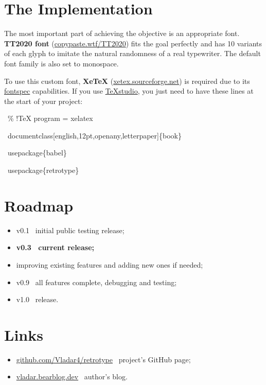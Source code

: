 \documentclass[english,12pt,openany,letterpaper]{book}
\begin{document}
\section{The Implementation}

The most important part of achieving the objective is an appropriate font. \textbf{TT2020 font} (\href{https://copypaste.wtf/TT2020/}{copypaste.wtf/TT2020}) fits the goal perfectly and has 10 variants of each glyph to imitate the natural randomness of a real typewriter. The default font family is also set to monospace.

\tab To use this custom font, \textbf{XeTeX} (\href{https://xetex.sourceforge.net/}{xetex.sourceforge.net}) is required due to its \href{https://ctan.org/pkg/fontspec}{fontspec} capabilities. If you use \href{https://www.texstudio.org/}{TeXstudio}, you just need to have these lines at the start of your project:

\begin{tabbox}[8][8]
\begin{textbox}
~\% !TeX program = xelatex

~\bs documentclass[english,12pt,openany,letterpaper]\{book\}

~\bs usepackage\{babel\}

~\bs usepackage\{retrotype\}
\end{textbox}
\end{tabbox}

\section{Roadmap}

\begin{itemize}
	\item v0.1 \dash\ initial public testing release;
	\item \textbf{v0.3 \dash\ current release;}
	\item improving existing features and adding new ones if needed;
	\item v0.9 \dash\ all features complete, debugging and testing;
	\item v1.0 \dash\ release.
\end{itemize}


\section{Links}

\begin{itemize}
	\item \href{https://github.com/Vladar4/retrotype}{github.com/Vladar4/retrotype} \dash\ project's GitHub page;
	\item \href{https://vladar.bearblog.dev}{vladar.bearblog.dev} \dash\ author's blog.
\end{itemize}
\end{document}
